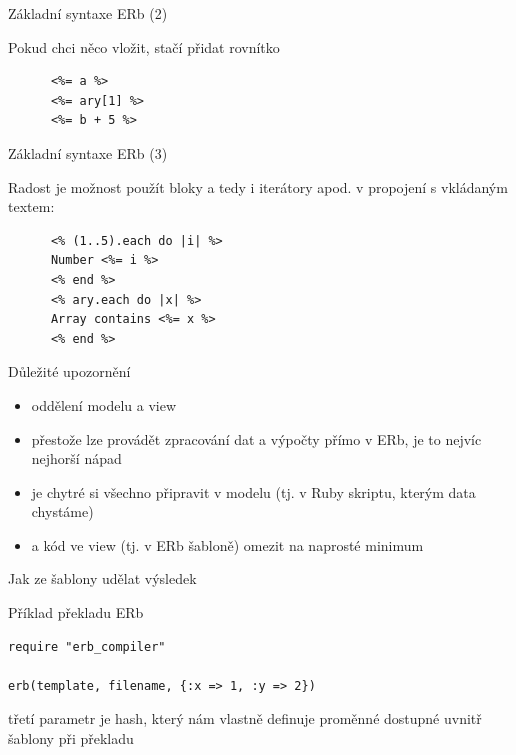\documentclass{beamer}
\begin{document}
\begin{frame}[fragile]{Základní syntaxe ERb (2)}
  \begin{block}{ }
    Pokud chci něco vložit, stačí přidat rovnítko
    \scriptsize
    \begin{verbatim}
      <%= a %>
      <%= ary[1] %>
      <%= b + 5 %>
    \end{verbatim}
  \end{block}
\end{frame}

\begin{frame}[fragile]{Základní syntaxe ERb (3)}
  \begin{block}{ }
    Radost je možnost použít bloky a tedy i iterátory apod. v propojení s vkládaným textem:
    \scriptsize
    \begin{verbatim}
      <% (1..5).each do |i| %>
      Number <%= i %>
      <% end %>
      <% ary.each do |x| %>
      Array contains <%= x %>
      <% end %>
    \end{verbatim}
  \end{block}
\end{frame}

\begin{frame}{Důležité upozornění}
  \begin{itemize}
    \item oddělení modelu a view
    \item přestože lze provádět zpracování dat a výpočty přímo v ERb, je to nejvíc nejhorší nápad
    \item je chytré si všechno připravit v modelu (tj. v Ruby skriptu, kterým data chystáme)
    \item a kód ve view (tj. v ERb šabloně) omezit na naprosté minimum
  \end{itemize}
\end{frame}

\begin{frame}[fragile]{Jak ze šablony udělat výsledek}
  \scriptsize
  \begin{block}{Příklad překladu ERb}
    \scriptsize
    \begin{verbatim}
require "erb_compiler"

erb(template, filename, {:x => 1, :y => 2})
    \end{verbatim}
  \end{block}
  třetí parametr je hash, který nám vlastně definuje proměnné dostupné uvnitř šablony při překladu
\end{frame}
\end{document}
